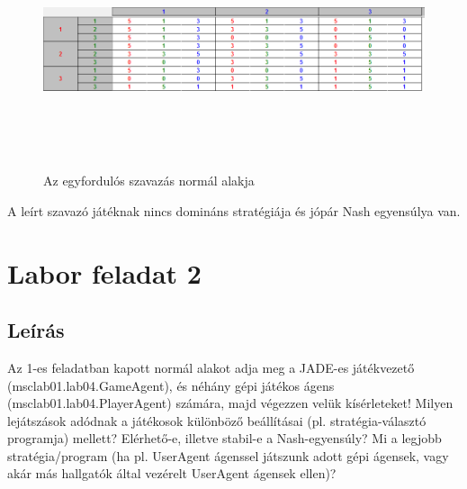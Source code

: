 \begin{figure}[h]
\begin{center}
\includegraphics[height=7cm]{figures/voting_small2.png}
\caption{Az egyfordulós szavazás normál alakja}
\end{center}
\end{figure}
A leírt szavazó játéknak nincs domináns stratégiája és jópár Nash egyensúlya van.

\section{Labor feladat 2}
\subsection{Leírás}
Az 1-es feladatban kapott normál alakot adja meg a JADE-es játékvezető (msclab01.lab04.GameAgent), és néhány gépi játékos ágens (msclab01.lab04.PlayerAgent) számára, majd végezzen velük kísérleteket! Milyen lejátszások adódnak a játékosok különböző beállításai (pl. stratégia-választó programja) mellett? Elérhető-e, illetve stabil-e a Nash-egyensúly? Mi a legjobb stratégia/program (ha pl. UserAgent ágenssel játszunk adott gépi ágensek, vagy akár más hallgatók által vezérelt UserAgent ágensek ellen)? 
